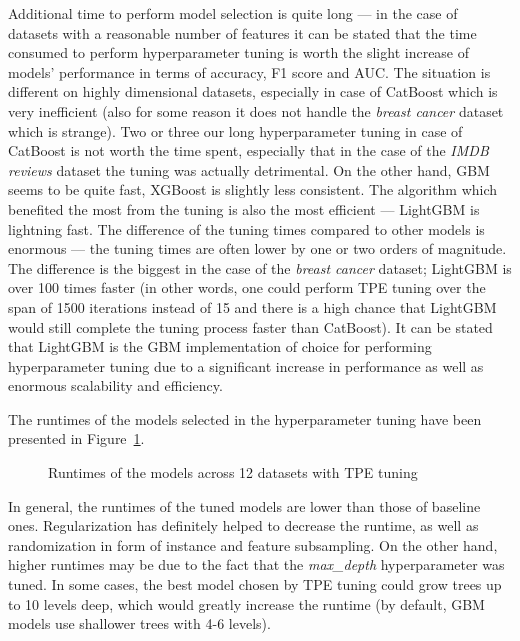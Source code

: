 \documentclass[magisterska, english]{pwr_wmat_praca_dyplomowa}
\theoremstyle{plain}
\numberwithin{theorem}{chapter}
\theoremstyle{definition}
\numberwithin{theorem}{chapter}
\begin{document}
Additional time to perform model selection is quite long --- in the case of datasets with a reasonable number of features it can be stated that the time consumed to perform hyperparameter tuning is worth the slight increase of models' performance in terms of accuracy, F1 score and AUC. The situation is different on highly dimensional datasets, especially in case of CatBoost which is very inefficient (also for some reason it does not handle the \emph{breast cancer} dataset which is strange). Two or three our long hyperparameter tuning in case of CatBoost is not worth the time spent, especially that in the case of the \emph{IMDB reviews} dataset the tuning was actually detrimental. On the other hand, GBM seems to be quite fast, XGBoost is slightly less consistent. The algorithm which benefited the most from the tuning is also the most efficient --- LightGBM is lightning fast. The difference of the tuning times compared to other models is enormous --- the tuning times are often lower by one or two orders of magnitude. The difference is the biggest in the case of the \emph{breast cancer} dataset; LightGBM is over 100 times faster (in other words, one could perform TPE tuning over the span of 1500 iterations instead of 15 and there is a high chance that LightGBM would still complete the tuning process faster than CatBoost). It can be stated that LightGBM is the GBM implementation of choice for performing hyperparameter tuning due to a significant increase in performance as well as enormous scalability and efficiency.

The runtimes of the models selected in the hyperparameter tuning have been presented in Figure~\ref{fig:tpe_runtimes}.

\begin{figure}[H]
	\centering
	\caption{Runtimes of the models across 12 datasets with TPE tuning}
	\label{fig:tpe_runtimes}
\end{figure}

In general, the runtimes of the tuned models are lower than those of baseline ones. Regularization has definitely helped to decrease the runtime, as well as randomization in form of instance and feature subsampling. On the other hand, higher runtimes may be due to the fact that the \emph{max\_depth} hyperparameter was tuned. In some cases, the best model chosen by TPE tuning could grow trees up to 10 levels deep, which would greatly increase the runtime (by default, GBM models use shallower trees with 4-6 levels).
\end{document}
